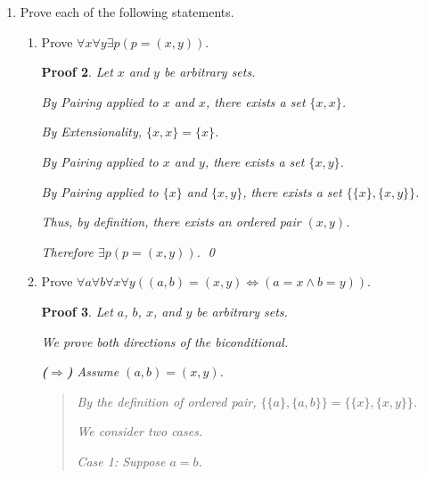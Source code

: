 \documentclass[12pt]{article}
\theoremstyle{proofstyle}
\newtheorem*{proof*}{Proof}
\begin{document}
\begin{enumerate}[left=0pt, itemsep=2em, parsep=1em]
\begin{enumerate}[label=(\alph*), itemsep=1.5em, leftmargin=2em]
\begin{proof*}
    By problem 1b, we have $x \cap y \subseteq x$.
    
    By problem 1c, we have $x \subseteq x \cup y$.
    
    By problem 1a (transitivity of $\subseteq$), since $x \cap y \subseteq x$ and $x \subseteq x \cup y$, we have $x \cap y \subseteq x \cup y$. \qed
\end{proof*}

\end{enumerate}

\item Prove each of the following statements.

\begin{enumerate}[label=(\alph*), itemsep=1.5em, leftmargin=2em]

\item Prove $\forall x\forall y\exists p(p = (x, y))$.

\begin{proof*}
    Let $x$ and $y$ be arbitrary sets.
        
    By Pairing applied to $x$ and $x$, there exists a set $\{x, x\}$.
    
    By Extensionality, $\{x, x\} = \{x\}$.
    
    By Pairing applied to $x$ and $y$, there exists a set $\{x, y\}$.
    
    By Pairing applied to $\{x\}$ and $\{x, y\}$, there exists a set $\{\{x\}, \{x, y\}\}$.

   Thus, by definition, there exists an ordered pair $(x,y)$.

    Therefore $\exists p(p = (x, y))$. \qed
\end{proof*}
\newpage
\item Prove $\forall a\forall b\forall x\forall y((a, b) = (x, y) \Leftrightarrow (a = x \wedge b = y))$.

\begin{proof*}
    Let $a$, $b$, $x$, and $y$ be arbitrary sets.
    
    We prove both directions of the biconditional.
    
    \textbf{($\Rightarrow$)} Assume $(a, b) = (x, y)$.

    \begin{quote}
        By the definition of ordered pair, $\{\{a\}, \{a, b\}\} = \{\{x\}, \{x, y\}\}$.
    
        We consider two cases.
        
        \textit{Case 1:} Suppose $a = b$.
        

\end{quote}
\end{proof*}
\end{enumerate}
\end{enumerate}
\end{document}
